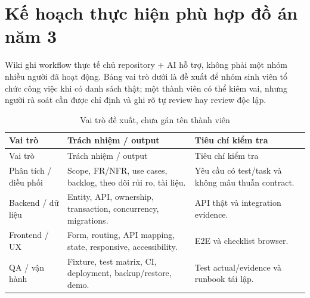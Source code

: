 \section{Kế hoạch thực hiện phù hợp đồ án năm 3}
Wiki ghi workflow thực tế chủ repository + AI hỗ trợ, không phải một nhóm nhiều người đã hoạt động. Bảng vai trò dưới là đề xuất để nhóm sinh viên tổ chức công việc khi có danh sách thật; một thành viên có thể kiêm vai, nhưng người rà soát cần được chỉ định và ghi rõ tự review hay review độc lập.
\begin{smalltable}\begin{longtable}{L{3cm}L{8cm}L{3.6cm}}
\caption{Vai trò đề xuất, chưa gán tên thành viên}\\\toprule Vai trò & Trách nhiệm / output & Tiêu chí kiểm tra\\\midrule\endfirsthead
\toprule Vai trò & Trách nhiệm / output & Tiêu chí kiểm tra\\\midrule\endhead
Phân tích / điều phối & Scope, FR/NFR, use cases, backlog, theo dõi rủi ro, tài liệu. & Yêu cầu có test/task và không mâu thuẫn contract.\\
Backend / dữ liệu & Entity, API, ownership, transaction, concurrency, migrations. & API thật và integration evidence.\\
Frontend / UX & Form, routing, API mapping, state, responsive, accessibility. & E2E và checklist browser.\\
QA / vận hành & Fixture, test matrix, CI, deployment, backup/restore, demo. & Test actual/evidence và runbook tái lập.\\\bottomrule
\end{longtable}\end{smalltable}

